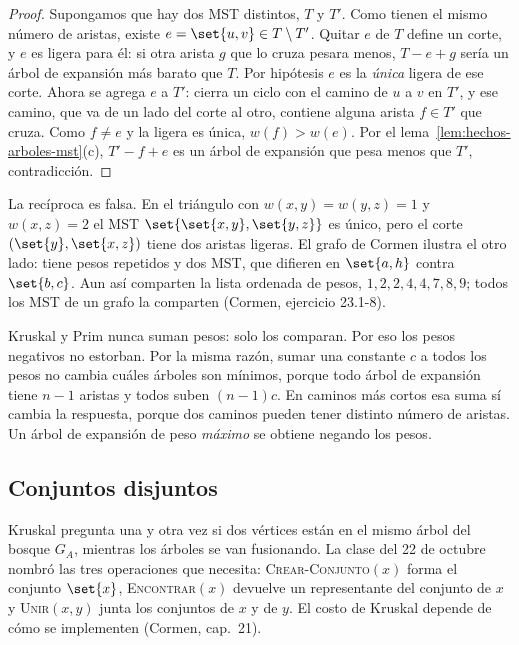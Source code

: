 \documentclass[11pt,letterpaper]{article}
\begin{document}
\begin{proof}
  Supongamos que hay dos MST distintos, $T$ y $T'$. Como tienen el
  mismo número de aristas, existe $e = \set{u, v} \in T \setminus T'$.
  Quitar $e$ de $T$ define un corte, y $e$ es ligera para él: si otra
  arista $g$ que lo cruza pesara menos, $T - e + g$ sería un árbol de
  expansión más barato que $T$. Por hipótesis $e$ es la \emph{única}
  ligera de ese corte. Ahora se agrega $e$ a $T'$: cierra un ciclo con
  el camino de $u$ a $v$ en $T'$, y ese camino, que va de un lado del
  corte al otro, contiene alguna arista $f \in T'$ que cruza. Como
  $f \neq e$ y la ligera es única, $w(f) > w(e)$. Por el
  lema~\ref{lem:hechos-arboles-mst}(c), $T' - f + e$ es un árbol de
  expansión que pesa menos que $T'$, contradicción.
\end{proof}

La recíproca es falsa. En el triángulo con $w(x,y) = w(y,z) = 1$ y
$w(x,z) = 2$ el MST $\set{\set{x,y}, \set{y,z}}$ es único, pero el
corte $(\set{y}, \set{x, z})$ tiene dos aristas ligeras. El grafo de
Cormen ilustra el otro lado: tiene pesos repetidos y dos MST, que
difieren en $\set{a,h}$ contra $\set{b,c}$. Aun así comparten la lista
ordenada de pesos, $1, 2, 2, 4, 4, 7, 8, 9$; todos los MST de un grafo
la comparten (Cormen, ejercicio 23.1-8).

\begin{observacion}
  Kruskal y Prim nunca suman pesos: solo los comparan. Por eso los
  pesos negativos no estorban. Por la misma razón, sumar una constante
  $c$ a todos los pesos no cambia cuáles árboles son mínimos, porque
  todo árbol de expansión tiene $n - 1$ aristas y todos suben
  $(n - 1)c$. En caminos más cortos esa suma sí cambia la respuesta,
  porque dos caminos pueden tener distinto número de aristas. Un árbol
  de expansión de peso \emph{máximo} se obtiene negando los pesos.
\end{observacion}


\subsection*{Conjuntos disjuntos}

Kruskal pregunta una y otra vez si dos vértices están en el mismo
árbol del bosque $G_A$, mientras los árboles se van fusionando. La
clase del 22 de octubre nombró las tres operaciones que necesita:
\textsc{Crear-Conjunto}$(x)$ forma el conjunto $\set{x}$,
\textsc{Encontrar}$(x)$ devuelve un representante del conjunto de $x$
y \textsc{Unir}$(x, y)$ junta los conjuntos de $x$ y de $y$. El costo
de Kruskal depende de cómo se implementen (Cormen, cap.\ 21).
\end{document}
